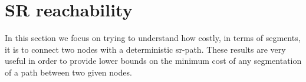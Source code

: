 \section{SR reachability}

In this section we focus on trying to understand how costly, in terms of segments, it is to connect two
nodes with a deterministic sr-path. These results are very useful in order to provide lower bounds on the 
minimum cost of any segmentation of a path between two given nodes.
% 
% 
% 







